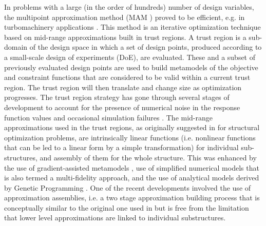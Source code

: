 \documentclass[runningheads,a4paper]{llncs}
\begin{document}
In problems with a large (in the order of hundreds) number of design variables, the multipoint approximation method (MAM \cite{Toropov1989,Toropov1992,ToropovFilatov1993}) proved to be efficient, e.g. in turbomachinery applications \cite{ShahparPolynkinToropov2008,PolynkinToropovShahpar2008,PolynkinToropovShahpar2010} . This method is an iterative optimization technique based on mid-range approximations built in trust regions. A trust region is a sub-domain of the design space in which a set of design points, produced according to a small-scale design of experiments (DoE), are evaluated. These and a subset of previously evaluated design points are used to build metamodels of the objective and constraint functions that are considered to be valid within a current trust region. The trust region will then translate and change size as optimization progresses. The trust region strategy has gone through several stages of development to account for the presence of numerical noise in the response function values \cite{KeulenToropovMarkine1996,ToropovKeulenMarkine1996} and occasional simulation failures \cite{ToropovMarkineHolden1999}. The mid-range approximations used in the trust regions, as originally suggested in \cite{Toropov1989} for structural optimization problems, are intrinsically linear functions (i.e. nonlinear functions that can be led to a linear form by a simple transformation) for individual sub-structures, and assembly of them for the whole structure. This was enhanced by the use of gradient-assisted metamodels \cite{ToropovFilatov1993}, use of simplified numerical models that is also termed a multi-fidelity approach,\cite{ToropovMarkine1996} and the use of analytical models derived by Genetic Programming \cite{ToropovAlvarez1998}. One of the recent developments \cite{PolynkinToropov2012} involved the use of approximation assemblies, i.e. a two stage approximation building process that is conceptually similar to the original one used in \cite{Toropov1989} but is free from the limitation that lower level approximations are linked to individual substructures.
\end{document}
